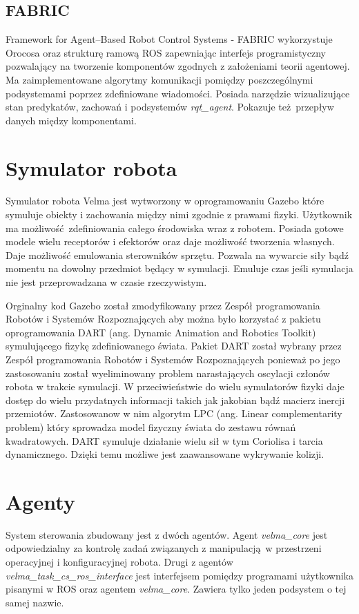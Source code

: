 	\subsection{FABRIC}
	Framework for Agent–Based Robot Control Systems - FABRIC\cite{Seredynski-fabric-romoco-2019-twiki} wykorzystuje Orocosa oraz strukturę ramową ROS zapewniając interfejs programistyczny pozwalający na tworzenie komponentów zgodnych z założeniami teorii agentowej. Ma zaimplementowane algorytmy komunikacji pomiędzy poszczególnymi podsystemami poprzez zdefiniowane wiadomości. Posiada narzędzie wizualizujące stan predykatów, zachowań i podsystemów \textit{rqt\_agent}. Pokazuje też przepływ danych między komponentami.

	
	\section{Symulator robota}
	Symulator robota Velma jest wytworzony w oprogramowaniu Gazebo które symuluje obiekty i zachowania między nimi zgodnie z prawami fizyki. Użytkownik ma możliwość zdefiniowania całego środowiska wraz z robotem. Posiada gotowe modele wielu receptorów i efektorów oraz daje możliwość tworzenia własnych. Daje możliwość emulowania sterowników sprzętu. Pozwala na wywarcie siły bądź momentu na dowolny przedmiot będący w symulacji. Emuluje czas jeśli symulacja nie jest przeprowadzana w czasie rzeczywistym.

	Orginalny kod Gazebo został zmodyfikowany przez Zespół programowania Robotów i Systemów Rozpoznających aby można było korzystać z pakietu oprogramowania DART (ang. Dynamic Animation and Robotics Toolkit) symulującego fizykę zdefiniowanego świata. Pakiet DART został wybrany przez Zespół programowania Robotów i Systemów Rozpoznających ponieważ po jego zastosowaniu został wyeliminowany problem narastających oscylacji członów robota w trakcie symulacji. W przeciwieństwie do wielu symulatorów fizyki daje dostęp do wielu przydatnych informacji takich jak jakobian bądź macierz inercji przemiotów. Zastosowanow w nim algorytm LPC (ang. Linear complementarity problem) który sprowadza model fizyczny świata do zestawu równań kwadratowych. DART symuluje działanie wielu sił w tym Coriolisa i tarcia dynamicznego. Dzięki temu możliwe jest zaawansowane wykrywanie kolizji. 
	
	\section{Agenty}
	System sterowania zbudowany jest z dwóch agentów. Agent \textit{velma\_core} jest odpowiedzialny za kontrolę zadań związanych z manipulacją w przestrzeni operacyjnej i konfiguracyjnej robota. Drugi z agentów \textit{velma\_task\_cs\_ros\_interface} jest interfejsem pomiędzy programami użytkownika pisanymi w ROS oraz agentem \textit{velma\_core}. Zawiera tylko jeden podsystem o tej samej nazwie.

